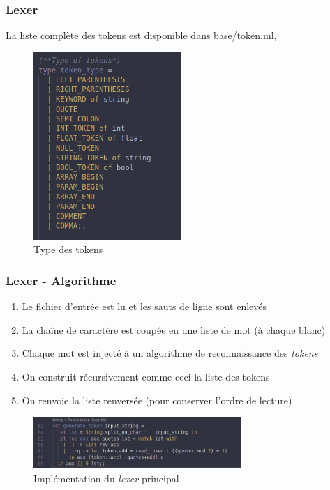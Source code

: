 \documentclass{beamer}
\begin{document}
    \begin{frame}
        \frametitle{Lexer}
        La liste complète des tokens est disponible dans base/token.ml,
        \begin{figure}[H]
            \center
            \includegraphics[width=0.5\textwidth]{img/tokentype.png}
            \caption{Type des tokens}
        \end{figure}
    \end{frame}

    \begin{frame}
        \frametitle{Lexer - Algorithme}
        \begin{enumerate}
            \item<1> Le fichier d'entrée est lu et les sauts de ligne sont enlevés
            \item<2> La chaîne de caractère est coupée en une liste de mot (à chaque blanc)
            \item<3> Chaque mot est injecté à un algorithme de reconnaissance des \textit{tokens}
            \item<4> On construit récursivement comme ceci la liste des tokens
            \item<5> On renvoie la liste renversée (pour conserver l'ordre de lecture)
        \end{enumerate}
        \begin{figure}[H]
            \center
            \includegraphics[width=0.7\textwidth]{img/implem.png}
            \caption{Implémentation du \textit{lexer} principal}
        \end{figure}
    \end{frame}
\end{document}
